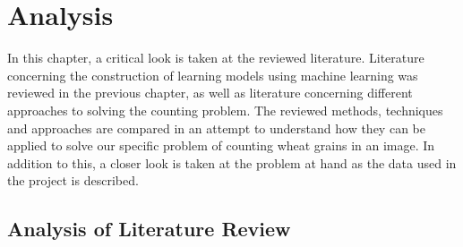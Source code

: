 \def\baselinestretch{1}

\chapter{Analysis}

\def\baselinestretch{1.66}



In this chapter, a critical look is taken at the reviewed literature. Literature concerning the construction of learning models using machine learning was reviewed in the previous chapter, as well as literature concerning different approaches to solving the counting problem. The reviewed methods, techniques and approaches are compared in an attempt to understand how they can be applied to solve our specific problem of counting wheat grains in an image. In addition to this, a closer look is taken at the problem at hand as the data used in the project is described. 

\smallskip

\goodbreak
\section{Analysis of Literature Review}
